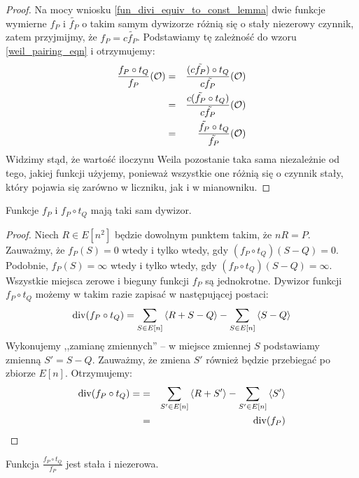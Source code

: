 \begin{proof}
Na mocy wniosku \ref{fun_divi_equiv_to_const_lemma}
dwie funkcje wymierne $f_P$ i $\tilde{f_P}$ o takim samym dywizorze
różnią się o stały niezerowy czynnik,
zatem przyjmijmy, że $f_P = c\tilde{f_P}$.
Podstawiamy tę zależność do wzoru \ref{weil_pairing_eqn} i otrzymujemy:
\begin{eqnarray*}
\frac{f_P \circ t_Q}{f_P}(\mathcal{O})
& = & \frac{(c\tilde{f_P}) \circ t_Q}{c\tilde{f_P}}(\mathcal{O}) \\
& = & \frac{c(\tilde{f_P} \circ t_Q)}{c\tilde{f_P}}(\mathcal{O}) \\
& = & \frac{\tilde{f_P} \circ t_Q}{\tilde{f_P}}(\mathcal{O})
\end{eqnarray*}
Widzimy stąd, że wartość iloczynu Weila pozostanie taka sama
niezależnie od tego, jakiej funkcji użyjemy,
ponieważ wszystkie one różnią się o czynnik stały,
który pojawia się zarówno w liczniku, jak i w mianowniku.
\end{proof}

\begin{lemma}\label{weil_pairing_same_divi_lemma}
Funkcje $f_P$ i $f_P \circ t_Q$ mają taki sam dywizor.
\end{lemma}

\begin{proof}
Niech $R \in E[n^2]$ będzie dowolnym punktem takim, że $nR = P$.
Zauważmy, że $f_P(S) = 0$ wtedy i tylko wtedy,
gdy $(f_P \circ t_Q)(S - Q) = 0$.
Podobnie, $f_P(S) = \infty$ wtedy i tylko wtedy,
gdy $(f_P \circ t_Q)(S - Q) = \infty$.
Wszystkie miejsca zerowe i bieguny funkcji $f_P$ są jednokrotne.
Dywizor funkcji $f_P \circ t_Q$ możemy w takim razie zapisać
w następującej postaci:
\begin{equation*}
\operatorname{div}(f_P \circ t_Q) =
\sum_{S \in E[n]} \left\langle R + S - Q\right\rangle - \sum_{S \in E[n]} \left\langle S - Q\right\rangle
\end{equation*}
Wykonujemy ,,zamianę zmiennych'' --
w miejsce zmiennej $S$ podstawiamy zmienną $S' = S - Q$.
Zauważmy, że zmiena $S'$ również będzie przebiegać po zbiorze $E[n]$.
Otrzymujemy:
\begin{eqnarray*}
\operatorname{div}(f_P \circ t_Q) =
& = & \sum_{S' \in E[n]} \left\langle R + S'\right\rangle - \sum_{S' \in E[n]} \left\langle S'\right\rangle \\
& = & \operatorname{div}(f_P)
\end{eqnarray*}
\end{proof}

\begin{corollary}\label{weil_pairing_fun_const_coro}
Funkcja $\frac{f_P \circ t_Q}{f_P}$ jest stała i niezerowa.
\end{corollary}


